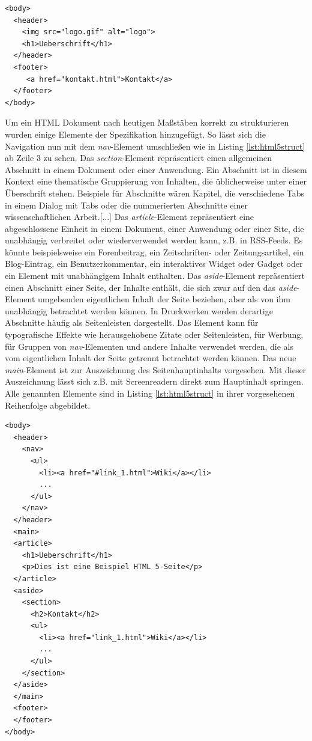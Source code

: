     \vspace{1em}
    \lstset{language=html}
	\begin{lstlisting}[frame=htrbl, caption=HTML 5 \textit{header}- und \textit{footer}-Element, label=lst:html5header]
<body>
  <header>
    <img src="logo.gif" alt="logo">
    <h1>Ueberschrift</h1>
  </header>
  <footer>
     <a href="kontakt.html">Kontakt</a>
  </footer>
</body>
	\end{lstlisting}
	
Um ein HTML Dokument nach heutigen Maßstäben korrekt zu strukturieren wurden einige Elemente der Spezifikation hinzugefügt. So lässt sich die Navigation nun mit dem \textit{nav}-Element umschließen wie in Listing \ref{lst:html5struct} ab Zeile 3 zu sehen. \glqq Das \textit{section}-Element repräsentiert einen allgemeinen Abschnitt in einem Dokument oder einer Anwendung. Ein Abschnitt ist in diesem Kontext eine thematische Gruppierung von Inhalten, die üblicherweise unter einer Überschrift stehen. Beispiele für Abschnitte wären Kapitel, die verschiedene Tabs in einem Dialog mit Tabs oder die nummerierten Abschnitte einer wissenschaftlichen Arbeit.[...] Das \textit{article}-Element repräsentiert eine abgeschlossene Einheit in einem Dokument, einer Anwendung oder einer Site, die unabhängig verbreitet oder wiederverwendet werden kann, z.B. in RSS-Feeds. Es könnte beispielsweise ein Forenbeitrag, ein Zeitschriften- oder Zeitungsartikel, ein Blog-Eintrag, ein Benutzerkommentar, ein interaktives Widget oder Gadget oder ein Element mit unabhängigem Inhalt enthalten. Das \textit{aside}-Element repräsentiert einen Abschnitt einer Seite, der Inhalte enthält, die sich zwar auf den das \textit{aside}-Element umgebenden eigentlichen Inhalt der Seite beziehen, aber als von ihm unabhängig betrachtet werden können. In Druckwerken werden derartige Abschnitte häufig als Seitenleisten dargestellt. Das Element kann für typografische Effekte wie herausgehobene Zitate oder Seitenleisten, für Werbung, für Gruppen von \textit{nav}-Elementen und andere Inhalte verwendet werden, die als vom eigentlichen Inhalt der Seite getrennt betrachtet werden können.\grqq{}\cite[S.43]{PilgDurc2011} Das neue \textit{main}-Element ist zur Auszeichnung des Seitenhauptinhalts vorgesehen. Mit dieser Auszeichnung lässt sich z.B. mit Screenreadern direkt zum Hauptinhalt springen.  Alle genannten Elemente sind in Listing \ref{lst:html5struct} in ihrer vorgesehenen Reihenfolge abgebildet.

    \vspace{1em}
    \lstset{language=html}
	\begin{lstlisting}[frame=htrbl, caption=HTML 5 Struktur Elemente, label=lst:html5struct]
<body>
  <header>
    <nav>
      <ul>
        <li><a href="#link_1.html">Wiki</a></li>
        ...
      </ul>
    </nav>
  </header>
  <main>
  <article>
    <h1>Ueberschrift</h1>
    <p>Dies ist eine Beispiel HTML 5-Seite</p>
  </article>
  <aside>
    <section>
      <h2>Kontakt</h2>
      <ul>
        <li><a href="link_1.html">Wiki</a></li>
        ...
      </ul>
    </section>
  </aside>
  </main>
  <footer>
  </footer>
</body>
	\end{lstlisting}

